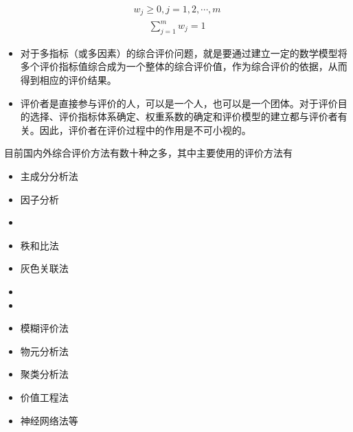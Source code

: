 \documentclass[letterpaper,10pt,english]{sphinxmanual}
\begin{document}
\begin{equation*}
\begin{split}
w_{j} \geq 0, j=1,2, \cdots, m
\end{split}
\end{equation*}\begin{equation*}
\begin{split}
\sum_{j=1}^{m} w_{j}=1
\end{split}
\end{equation*}\begin{itemize}
\item {} 
 对于多指标（或多因素）的综合评价问题，就是要通过建立一定的数学模型将多个评价指标值综合成为一个整体的综合评价值，作为综合评价的依据，从而得到相应的评价结果。

\item {} 
 评价者是直接参与评价的人，可以是一个人，也可以是一个团体。对于评价目的选择、评价指标体系确定、权重系数的确定和评价模型的建立都与评价者有关。因此，评价者在评价过程中的作用是不可小视的。

\end{itemize}

目前国内外综合评价方法有数十种之多，其中主要使用的评价方法有
\begin{itemize}
\item {} 
主成分分析法

\item {} 
因子分析

\item {} 

\item {} 
秩和比法

\item {} 
灰色关联法

\item {} 

\item {} 

\item {} 
模糊评价法

\item {} 
物元分析法

\item {} 
聚类分析法

\item {} 
价值工程法

\item {} 
神经网络法等

\end{itemize}
\end{document}
